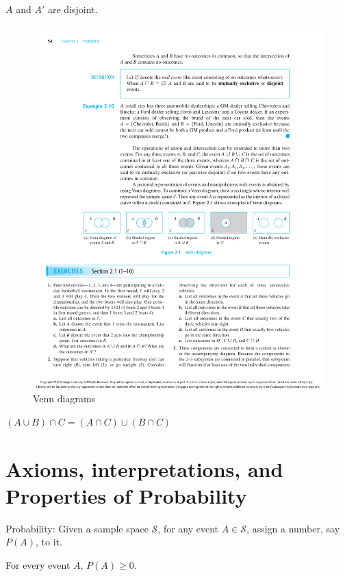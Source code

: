 \begin{prop}
$A$ and $A'$ are disjoint.
\end{prop}


\begin{figure}[H]
\includegraphics[width=15cm]{figures/venn_diagram.pdf}
\caption{Venn diagrams}
\label{fig:4}
\end{figure}

\begin{exmp}
  $(A\cup B)\cap C=(A \cap C)\cup(B \cap C)$
\end{exmp}


\section{Axioms, interpretations, and Properties of Probability}
Probability: Given a sample space $\mathcal{S}$, for any event $A\in \mathcal{S}$, assign a number, say $P(A)$, to it.
\begin{axio}
  For every event $A$, $P(A)\geq 0$.
\end{axio}

